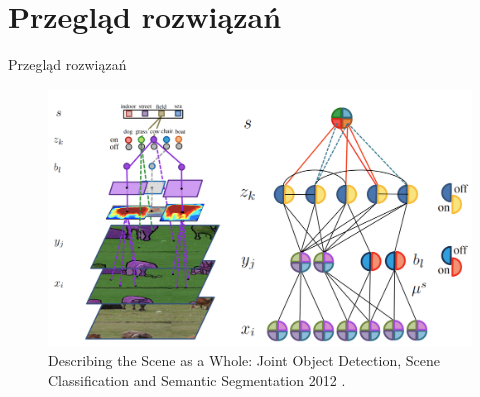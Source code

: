 \documentclass[10pt]{beamer}
\begin{document}
    \section[Przegląd rozwiązań]{Przegląd rozwiązań}
    \begin{frame}{Przegląd rozwiązań}
        
        \begin{figure}
            \includegraphics[width=\textwidth]{images/joint-segmentation-and-classification.png}
            \caption{Describing the Scene as a Whole: Joint Object Detection, Scene Classification and Semantic Segmentation 2012 \cite{yao2012describing}.}
        \end{figure}
    \end{frame}
    
        
            
\end{document}
